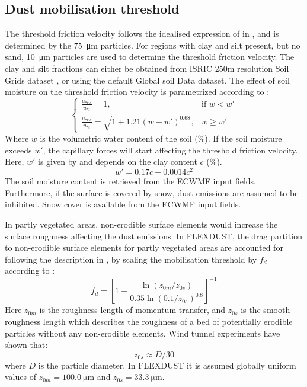 \subsection{Dust mobilisation threshold}
The threshold friction velocity follows the idealised expression of \textcite{shao2000simple} in , and is determined by the \SI{75}{\micro\metre} particles. 
For regions with clay and silt present, but no sand, \SI{10}{\micro\metre} 
particles are used to determine the threshold friction velocity. The clay and 
silt fractions can either be obtained from ISRIC 250m resolution Soil Grids dataset 
\parencite{soil-grid_ref}, or using the default Global soil Data \cite{task2014global} dataset. 
The effect of soil moisture on the threshold friction velocity is parametrized according to \textcite{fecan1998parametrization}:
\begin{equation}
    \begin{cases}
    \frac{u_{*tw}}{u_{*t}}=1, & \text{if } w < w' \\
    \frac{u_{*tw}}{u_{*t}}=\sqrt{1+1.21(w-w')^{0.68}}, & w \geq w'
    \end{cases}
\end{equation}
Where $w$ is the volumetric water content of the soil (\%). If the soil moisture exceeds $w'$, the capillary 
forces will start affecting the threshold friction velocity. Here, $w'$ is given by  
and depends on the clay content $c$ (\%).   
\begin{equation} \label{eq:moisture_clay}
    w' = 0.17c + 0.0014c^2
\end{equation}
The soil moisture content is retrieved from the ECWMF input fields.
Furthermore, if the surface is covered by snow, dust emissions are assumed to be inhibited. 
Snow cover is available from the ECWMF input fields. 
\par In partly vegetated areas, non-erodible surface elements would increase the surface 
roughness affecting the dust emissions. In FLEXDUST, the drag partition to non-erodible 
surface elements for partly vegetated areas are accounted for following the description in 
\textcite{zender2003mineral}, by scaling the mobilisation threshold by $f_d$ according to :
\begin{equation}\label{eq:drag_partition}
    f_d = \left[1 - \frac{\ln (z_{0m}/z_{0s})}{0.35\ln (0.1/z_{0s})^{0.8}}\right]^{-1}
\end{equation}
Here $z_{0m}$ is the roughness length of momentum transfer, and $z_{0s}$ is the smooth roughness length which 
describes the roughness of a bed of potentially erodible particles without any non-erodible elements. Wind tunnel 
experiments have shown that: 
\begin{equation}
    z_{0s} \approx D/30
\end{equation}
where $D$ is the particle diameter. In FLEXDUST it is assumed globally uniform values of  $z_{0m}=\SI{100.0}{\micro\metre}$ and $z_{0s}=\SI{33.3}{\micro\metre}$.


